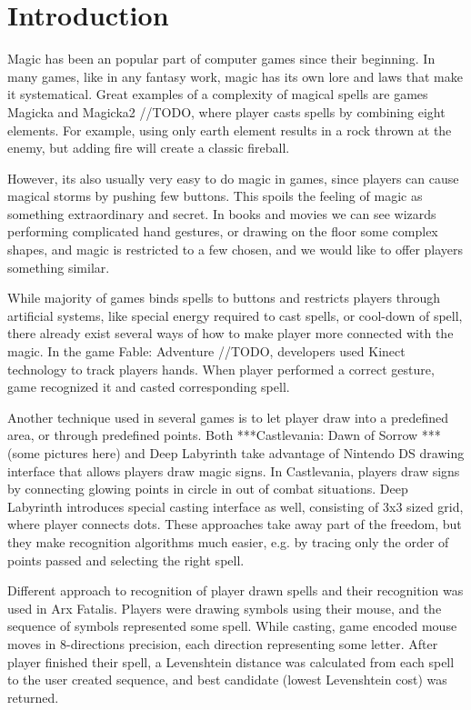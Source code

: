 \chapter{Introduction}
\label{chap:gf}

Magic has been an popular part of computer games since their beginning. In many games, like in any fantasy work, magic has its own lore and laws that make it systematical. Great examples of a complexity of magical spells are games Magicka and Magicka2 //TODO, where player casts spells by combining eight elements. For example, using only earth element results in a rock thrown at the enemy, but adding fire will create a classic fireball.

However, its also usually very easy to do magic in games, since players can cause magical storms by pushing few buttons. This spoils the feeling of magic as something extraordinary and secret. In books and movies we can see wizards performing complicated hand gestures, or drawing on the floor some complex shapes, and magic is restricted to a few chosen, and we would like to offer players something similar.

While majority of games binds spells to buttons and restricts players through artificial systems, like special energy required to cast spells, or cool-down of spell, there already exist several ways of how to make player more connected with the magic. In the game Fable: Adventure //TODO, developers used Kinect technology to track players hands. When player performed a correct gesture, game recognized it and casted corresponding spell. 

Another technique used in several games is to let player draw into a predefined area, or through predefined points. Both ***Castlevania: Dawn of Sorrow ***(some pictures here) and Deep Labyrinth take advantage of Nintendo DS drawing interface that allows players draw magic signs. In Castlevania, players draw signs by connecting glowing points in circle in out of combat situations. Deep Labyrinth introduces special casting interface as well, consisting of 3x3 sized grid, where player connects dots. These approaches take away part of the freedom, but they make recognition algorithms much easier, e.g. by tracing only the order of points passed and selecting the right spell.

Different approach to recognition of player drawn spells and their recognition was used in Arx Fatalis. Players were drawing symbols using their mouse, and the sequence of symbols represented some spell. While casting, game encoded mouse moves in 8-directions precision, each direction representing some letter. After player finished their spell, a Levenshtein distance was calculated from each spell to the user created sequence, and best candidate (lowest Levenshtein cost) was returned. 

